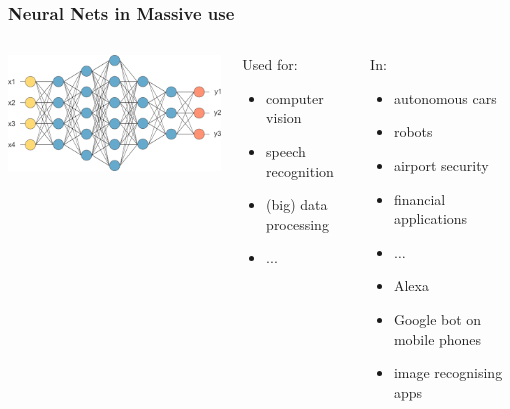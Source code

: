 \documentclass{beamer}
\begin{document}
	\begin{frame}
  \frametitle{Neural Nets in Massive use}
 

    
 \begin{columns}

   
    \begin{center}
      \includegraphics[scale=0.3]{NN}
    \end{center}  

\begin{block}{Used for:}

 \begin{itemize}
  \item computer vision 
  \item speech recognition
  \item  (big) data processing
    \item ...
    \end{itemize}

  
\end{block}






 
\begin{block}{In:}
 
\begin{itemize}
\item autonomous cars
\item robots
\item airport security
  \item financial applications
\item $\ldots$
\item Alexa
\item Google bot on mobile phones
\item image recognising apps 
\end{itemize}

  \end{block}


 \end{columns}
    
\end{frame}
\end{document}
